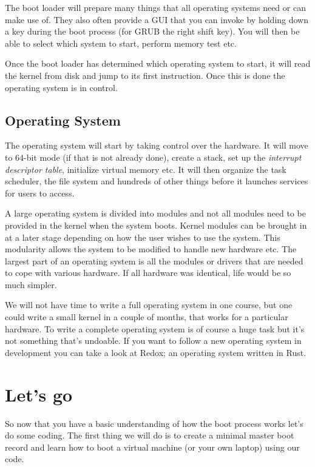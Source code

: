 \documentclass[a4paper,11pt]{article}
\begin{document}
The boot loader will prepare many things that all operating systems
need or can make use of. They also often provide a GUI that you can
invoke by holding down a key during the boot process (for GRUB the
right shift key). You will then be able to select which system to
start, perform memory test etc.

Once the boot loader has determined which operating system to start, it
will read the kernel from disk and jump to its first
instruction. Once this is done the operating system is in control.


\subsection{Operating System}

The operating system will start by taking control over the
hardware. It will move to 64-bit mode (if that is not already done),
create a stack, set up the {\em interrupt descriptor table},
initialize virtual memory etc. It will then organize the task
scheduler, the file system and hundreds of other things before it
launches services for users to access. 

A large operating system is divided into modules and not all modules
need to be provided in the kernel when the system boots. Kernel
modules can be brought in at a later stage depending on how the user
wishes to use the system. This modularity allows the system to be
modified to handle new hardware etc. The largest part of an operating
system is all the modules or drivers that are needed to cope with
various hardware. If all hardware was identical, life would be so much
simpler.

We will not have time to write a full operating system in one course, but one
could write a small kernel in a couple of months, that works
for a particular hardware. To write a complete operating system is of
course a huge task but it's not something that's undoable. If you want
to follow a new operating system in development you can take a look at
Redox; an operating system written in Rust.

\section{Let's go}

So now that you have a basic understanding of how the boot process
works let's do some coding. The first thing we will do is to create a
minimal master boot record and learn how to boot a virtual machine (or
your own laptop) using our code.
\end{document}
